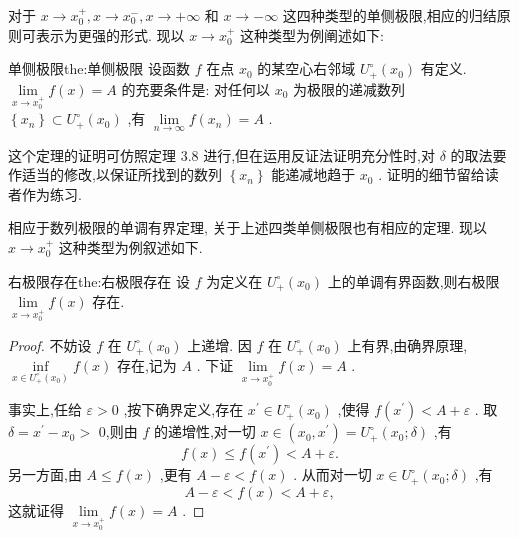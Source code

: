 对于 \(x \rightarrow  {x}_{0}^{ + },x \rightarrow  {x}_{0}^{ - },x \rightarrow   + \infty\) 和 \(x \rightarrow   - \infty\) 这四种类型的单侧极限,相应的归结原则可表示为更强的形式. 现以 \(x \rightarrow  {x}_{0}^{ + }\) 这种类型为例阐述如下:

\begin{theorem}{单侧极限}{the:单侧极限}
设函数 \(f\) 在点 \({x}_{0}\) 的某空心右邻域 \({U}_{ + }^{ \circ  }\left( {x}_{0}\right)\) 有定义. \(\mathop{\lim }\limits_{{x \rightarrow  {x}_{0}^{ + }}}f\left( x\right)  = A\) 的充要条件是: 对任何以 \({x}_{0}\) 为极限的递减数列 \(\left\{  {x}_{n}\right\}   \subset  {U}_{ + }^{ \circ  }\left( {x}_{0}\right)\) ,有 \(\mathop{\lim }\limits_{{n \rightarrow  \infty }}f\left( {x}_{n}\right)  = A\) .
\end{theorem}


这个定理的证明可仿照定理 3.8 进行,但在运用反证法证明充分性时,对 \(\delta\) 的取法要作适当的修改,以保证所找到的数列 \(\left\{  {x}_{n}\right\}\) 能递减地趋于 \({x}_{0}\) . 证明的细节留给读者作为练习.

相应于数列极限的单调有界定理, 关于上述四类单侧极限也有相应的定理. 现以 \(x \rightarrow  {x}_{0}^{ + }\) 这种类型为例叙述如下.

\begin{theorem}{右极限存在}{the:右极限存在}
设 \(f\) 为定义在 \({U}_{ + }^{ \circ  }\left( {x}_{0}\right)\) 上的单调有界函数,则右极限 \(\mathop{\lim }\limits_{{x \rightarrow  {x}_{0}^{ + }}}f\left( x\right)\) 存在.
\end{theorem}


\begin{proof}
不妨设 \(f\) 在 \({U}_{ + }^{ \circ  }\left( {x}_{0}\right)\) 上递增. 因 \(f\) 在 \({U}_{ + }^{ \circ  }\left( {x}_{0}\right)\) 上有界,由确界原理, \(\mathop{\inf }\limits_{{x \in  {U}_{ + }^{ \circ  }\left( {x}_{0}\right) }}f\left( x\right)\) 存在,记为 \(A\) . 下证 \(\mathop{\lim }\limits_{{x \rightarrow  {x}_{0}^{ + }}}f\left( x\right)  = A\) .

事实上,任给 \(\varepsilon  > 0\) ,按下确界定义,存在 \({x}^{\prime } \in  {U}_{ + }^{ \circ  }\left( {x}_{0}\right)\) ,使得 \(f\left( {x}^{\prime }\right)  < A + \varepsilon\) . 取 \(\delta  = {x}^{\prime } - {x}_{0} >\) 0,则由 \(f\) 的递增性,对一切 \(x \in  \left( {{x}_{0},{x}^{\prime }}\right)  = {U}_{ + }^{ \circ  }\left( {{x}_{0};\delta }\right)\) ,有
\[
f\left( x\right)  \leq  f\left( {x}^{\prime }\right)  < A + \varepsilon .
\]
另一方面,由 \(A \leq  f\left( x\right)\) ,更有 \(A - \varepsilon  < f\left( x\right)\) . 从而对一切 \(x \in  {U}_{ + }^{ \circ  }\left( {{x}_{0};\delta }\right)\) ,有
\[
A - \varepsilon  < f\left( x\right)  < A + \varepsilon ,
\]
这就证得 \(\mathop{\lim }\limits_{{x \rightarrow  {x}_{0}^{ + }}}f\left( x\right)  = A\) .
\end{proof}


